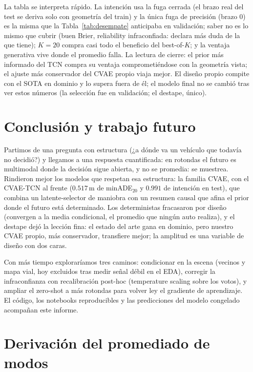 \documentclass[conference,a4paper]{IEEEtran}
\begin{document}
La tabla se interpreta rápido. La intención usa la fuga cerrada (el brazo
real del test se deriva solo con geometría del train) y la única fuga de
precisión (brazo 0) es la
misma que la Tabla~\ref{tab:desempate} anticipaba en validación; saber no
es lo mismo que cubrir (buen Brier, reliability infraconfiada: declara más
duda de la que tiene); $K=20$ compra casi todo el beneficio del
best-of-$K$; y la ventaja generativa vive donde el promedio falla. La
lectura de cierre: el prior más informado del TCN compra su ventaja
comprometiéndose con la geometría vista; el ajuste más conservador del
CVAE propio viaja mejor. El diseño propio compite con el SOTA en dominio y
lo supera fuera de él; el modelo final no se cambió tras ver estos números
(la selección fue en validación; el destape, único).

\section{Conclusión y trabajo futuro}

Partimos de una pregunta con estructura (¿a dónde va un vehículo que
todavía no decidió?) y llegamos a una respuesta cuantificada: en rotondas
el futuro es multimodal donde la decisión sigue abierta, y no se promedia:
se muestrea. Rindieron mejor los modelos que respetan esa estructura: la
familia CVAE, con el CVAE-TCN al frente ($0.517$\,m de minADE$_{20}$ y
$0.991$ de intención en test), que combina un latente-selector de maniobra
con un resumen causal que afina el prior donde el futuro está determinado.
Los deterministas fracasaron por diseño (convergen a la media condicional,
el promedio que ningún auto realiza), y el destape dejó la lección fina:
el estado del arte gana en dominio, pero nuestro CVAE propio, más
conservador, transfiere mejor; la amplitud es una variable de diseño con
dos caras.

Con más tiempo exploraríamos tres caminos: condicionar en la escena
(vecinos y mapa vial, hoy excluidos tras medir señal débil en el EDA),
corregir la infraconfianza con recalibración post-hoc (temperature scaling
sobre los votos), y ampliar el zero-shot a más rotondas para volver ley el
gradiente de aprendizaje. El código, los notebooks reproducibles y las
predicciones del modelo congelado acompañan este informe.
\newpage
\appendices
\section{Derivación del promediado de modos}\label{ap:modeavg}
\end{document}
